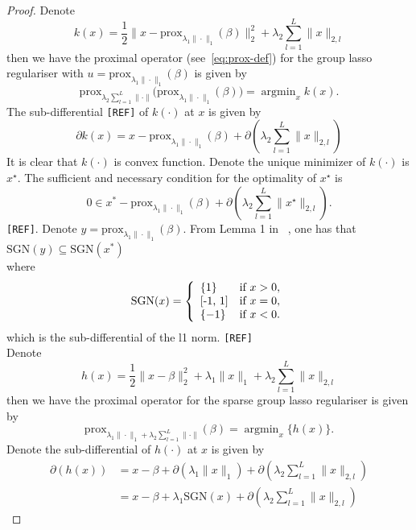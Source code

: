 \documentclass[11pt]{article}
\DeclareMathOperator{\argmin}{argmin}
\newcommand{\norm}[1]{\|#1\|}
\begin{document}
\begin{proof}
Denote 
\begin{equation*}
    k(x) =  \frac{1}{2}\norm{ x - \text{prox}_{\lambda_1 \norm{\cdot}_1}(\beta)}_2^2 + \lambda_2 \sum_{l=1}^L \norm{x}_{2,l}
\end{equation*}
then we have the proximal operator (see~\eqref{eq:prox-def}) for the group lasso regulariser with $u = \text{prox}_{\lambda_1 \norm{\cdot}_1}(\beta)$ is given by
\begin{equation*}
    \text{prox}_{\lambda_2 \sum_{l=1}^L \norm{\cdot}}\big(\text{prox}_{\lambda_1 \norm{\cdot}_1}(\beta)\big) = \argmin_x k(x).
\end{equation*}
The sub-differential \texttt{[REF]} of $k(\cdot)$ at $x$ is given by
\begin{equation*}
    \partial k(x) = x - \text{prox}_{\lambda_1 \norm{\cdot}_1}(\beta) + \partial( \lambda_2 \sum_{l=1}^L \norm{x}_{2,l} )
\end{equation*}
It is clear that $k(\cdot)$ is convex function. Denote the unique minimizer of $k(\cdot)$ is $x^\star$. The sufficient and necessary condition for the optimality of $x^\star$ is 
\begin{equation}
    \label{eq:opt_gl}
    0 \in x^* - \text{prox}_{\lambda_1 \norm{\cdot}_1}(\beta) + \partial( \lambda_2 \sum_{l=1}^L \norm{x^\star}_{2,l} ).
\end{equation}
\texttt{[REF]}.
Denote $y = \text{prox}_{\lambda_1\norm{\cdot}_1}(\beta)$. From Lemma 1 in ~\citet{yuan2011efficient}, one has that $\text{SGN}(y) \subseteq \text{SGN}(x^*)$\\
where \[\text{SGN}(x) = 
\left\{
  \begin{array}{ll}
    \{1\} &\text{if } x > 0, \\ 
    $[-1, 1]$ &\text{if } x = 0, \\ 
    \{-1\} &\text{if } x < 0. 
  \end{array}
\right. \]
which is the sub-differential of the l1 norm. \texttt{[REF]} \\
\noindent Denote 
\begin{equation*}
    h(x) =  \frac{1}{2}\norm{x - \beta}_2^2 + \lambda_1 \norm{x}_1 + \lambda_2 \sum_{l=1}^L \norm{x}_{2,l}
\end{equation*}
then we have the  proximal  operator  for  the  sparse  group  lasso  regulariser is given by
\begin{equation*}
    \text{prox}_{\lambda_1 \norm{\cdot}_1 + \lambda_2 \sum_{l=1}^L \norm{\cdot}}(\beta) = \argmin_{x} \{ h(x)\}.
\end{equation*}
Denote the sub-differential of $h(\cdot)$ at $x$ is given by
\begin{align*}
    \partial(h(x)) &= x - \beta + \partial(\lambda_1 \norm{x}_1) + \partial( \lambda_2 \sum_{l=1}^L \norm{x}_{2, l} ) \\
    &= x - \beta + \lambda_1 \text{SGN}(x) + \partial( \lambda_2 \sum_{l=1}^L \norm{x}_{2, l} )
\end{align*}


\end{proof}
\end{document}
